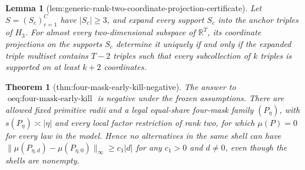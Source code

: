 \documentclass{article}
\newtheorem{theorem}{Theorem}
\newtheorem{lemma}{Lemma}
\begin{document}
\begin{lemma}[lem:generic-rank-two-coordinate-projection-certificate]\label{lem:generic-rank-two-coordinate-projection-certificate}
Let \(S=(S_c)_{c=1}^C\) have \(|S_c|\geq 3\), and expand every support \(S_c\) into the anchor triples of \(H_3\).  For almost every two-dimensional subspace of \(\mathbb R^T\), its coordinate projections on the supports \(S_c\) determine it uniquely if and only if the expanded triple multiset contains \(T-2\) triples such that every subcollection of \(k\) triples is supported on at least \(k+2\) coordinates.
\end{lemma}

\begin{theorem}[thm:four-mask-early-kill-negative]\label{thm:four-mask-early-kill-negative}
The answer to \(\operatorname{oeq:four-mask-early-kill}\) is negative under the frozen assumptions. There are allowed fixed primitive radii and a legal equal-share four-mask family \((P_\eta)\), with \(s(P_\eta)\asymp|\eta|\) and every local factor restriction of rank two, for which \(\mu(P)=0\) for every law in the model. Hence no alternatives in the same shell can have \(\|\mu(P_{\eta,d})-\mu(P_{\eta,0})\|_\infty\geq c_1|d|\) for any \(c_1>0\) and \(d\ne0\), even though the shells are nonempty.
\end{theorem}
\end{document}
